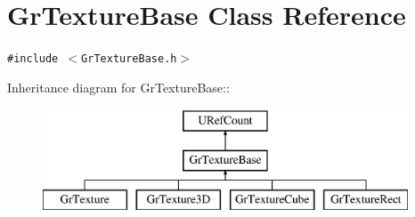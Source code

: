 \hypertarget{class_gr_texture_base}{
\section{GrTextureBase Class Reference}
\label{class_gr_texture_base}
}
{\tt \#include $<$GrTextureBase.h$>$}

Inheritance diagram for GrTextureBase::\begin{figure}[H]
\begin{center}
\leavevmode
\includegraphics[height=3cm]{class_gr_texture_base}
\end{center}
\end{figure}

